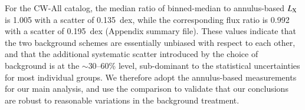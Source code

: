 \documentclass{aa}
\begin{document}
\begin{appendix}
For the CW-All catalog, the median ratio of binned-median to annulus-based $L_{\rm X}$ is 1.005 with a scatter of 0.135~dex, while the corresponding flux ratio is 0.992 with a scatter of 0.195~dex (Appendix summary file). These values indicate that the two background schemes are essentially unbiased with respect to each other, and that the additional systematic scatter introduced by the choice of background is at the $\sim 30$--60\% level, sub-dominant to the statistical uncertainties for most individual groups. We therefore adopt the annulus-based measurements for our main analysis, and use the comparison to validate that our conclusions are robust to reasonable variations in the background treatment.

\end{appendix}

\end{document}
